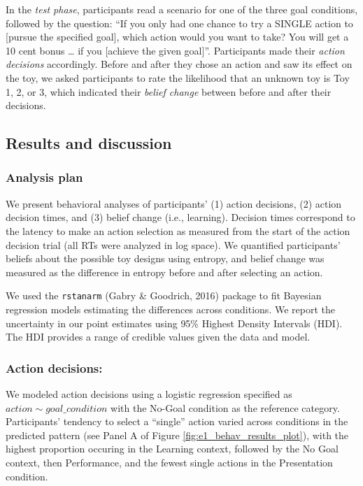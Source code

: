 \documentclass[10pt, letterpaper]{article}
\begin{document}
In the \emph{test phase}, participants read a scenario for one of the
three goal conditions, followed by the question: ``If you only had one
chance to try a SINGLE action to {[}pursue the specified goal{]}, which
action would you want to take? You will get a 10 cent bonus \ldots{} if
you {[}achieve the given goal{]}''. Participants made their \emph{action
decisions} accordingly. Before and after they chose an action and saw
its effect on the toy, we asked participants to rate the likelihood that
an unknown toy is Toy 1, 2, or 3, which indicated their \emph{belief
change} between before and after their decisions.

\subsection{Results and discussion}\label{results-and-discussion}

\subsubsection{Analysis plan}\label{analysis-plan}

We present behavioral analyses of participants' (1) action decisions,
(2) action decision times, and (3) belief change (i.e., learning).
Decision times correspond to the latency to make an action selection as
measured from the start of the action decision trial (all RTs were
analyzed in log space). We quantified participants' beliefs about the
possible toy designs using entropy, and belief change was measured as
the difference in entropy before and after selecting an action.

We used the \texttt{rstanarm} (Gabry \& Goodrich, 2016) package to fit
Bayesian regression models estimating the differences across conditions.
We report the uncertainty in our point estimates using 95\% Highest
Density Intervals (HDI). The HDI provides a range of credible values
given the data and model.

\subsubsection{Action decisions:}\label{action-decisions}

We modeled action decisions using a logistic regression specified as
\texttt{$action \sim goal\_condition$} with the No-Goal condition as the
reference category. Participants' tendency to select a ``single'' action
varied across conditions in the predicted pattern (see Panel A of Figure
\ref{fig:e1_behav_results_plot}), with the highest proportion occuring
in the Learning context, followed by the No Goal context, then
Performance, and the fewest single actions in the Presentation
condition.
\end{document}
